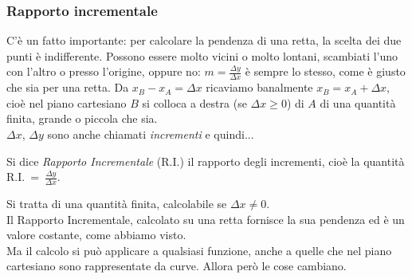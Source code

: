 \subsubsection{Rapporto incrementale}
\label{subsubsec:diff01_rappincr}
C'è un fatto importante: per calcolare la pendenza di una retta, 
la scelta dei due punti è indifferente. Possono essere molto vicini o molto 
lontani, scambiati l'uno con l'altro o presso l'origine, oppure no:
$m=\frac{\Delta y}{\Delta x}$ è sempre lo stesso, come è giusto che sia per 
una retta.
Da $x_B-x_A=\Delta x$ ricaviamo banalmente $x_B=x_A+\Delta x$, cioè nel 
piano 
cartesiano
$B$ si colloca a destra (se $\Delta x\ge 0$) di $A$ di una quantità finita,
grande o piccola che sia.\\
$\Delta x$, $\Delta y$ sono anche chiamati \emph{incrementi} e quindi...
\begin{definizione}
  Si dice \emph{Rapporto Incrementale} (R.I.) il rapporto degli
  incrementi, cioè la quantità R.I.~=~$\frac{\Delta y}{\Delta x}$.
\end{definizione}
Si tratta di una quantità finita, calcolabile se $\Delta x \ne 0$.\\
Il Rapporto Incrementale, calcolato su una retta fornisce la sua pendenza 
ed è un valore costante, come abbiamo visto.\\
Ma il calcolo si può applicare a qualsiasi funzione, anche a quelle che nel 
piano cartesiano sono rappresentate da curve. Allora però le cose cambiano.

